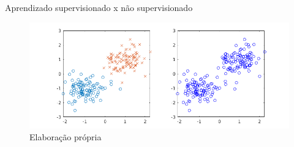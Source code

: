 \documentclass[aspectratio=169,presentation,mathserif,10pt]{beamer}
\begin{document}
\begin{frame}[label={sec:org07d1567}]{Aprendizado supervisionado x não supervisionado}
\begin{figure}[htbp]
\centering
\includegraphics[height=0.6\textheight]{./fig/sxns.png}
\caption{Elaboração própria}
\end{figure}
\end{frame}
\end{document}
